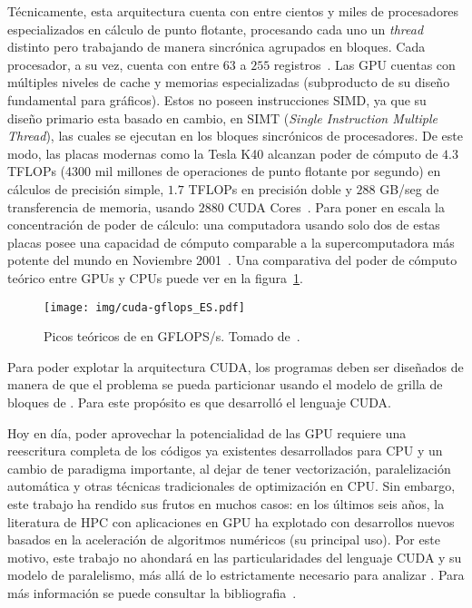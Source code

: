 T\'ecnicamente, esta arquitectura cuenta con entre cientos y miles de procesadores especializados en c\'alculo de punto flotante, procesando cada uno un \textit{thread} distinto pero
trabajando de manera sincr\'onica agrupados en bloques.
Cada procesador, a su vez, cuenta con entre $63$ a $255$ registros~\cite{NvidiaFermi,NvidiaKepler}.
Las GPU cuentas con m\'ultiples niveles de cache y memorias especializadas (subproducto de su dise\~no fundamental para gr\'aficos).
Estos no poseen instrucciones SIMD, ya que su dise\~no primario esta basado en cambio, en SIMT (\textit{Single Instruction Multiple Thread}), las cuales se ejecutan en los bloques sincr\'onicos de procesadores.
De este modo, las placas modernas como la \nvidia{} Tesla K40 alcanzan poder de c\'omputo de $4.3$ TFLOPs (4300 mil millones de operaciones de punto flotante por segundo) en c\'alculos de precisi\'on simple, $1.7$ TFLOPs en precisi\'on doble y $288$ GB/seg de transferencia de memoria, usando $2880$ CUDA Cores~\cite{NvidiaKeplerDatasheet}.
Para poner en escala la concentraci\'on de poder de c\'alculo: una computadora usando solo dos de estas placas posee una capacidad
de c\'omputo comparable a la supercomputadora m\'as potente del mundo en Noviembre 2001~\cite{Top500November2001}.
Una comparativa del poder de c\'omputo te\'orico entre GPUs y CPUs puede ver en la figura~\ref{fig:cuda-gflops}.

\begin{figure}[htbp]
    \centering
    \texttt{[image: img/cuda-gflops\_ES.pdf]}
    \caption{Picos te\'oricos de \performance{} en GFLOPS/s. Tomado de~\cite{cudaProgrammingGuide}.}
    \label{fig:cuda-gflops}
\end{figure}

Para poder explotar la arquitectura CUDA, los programas deben ser dise\~nados de manera de que el problema se pueda particionar usando el modelo de grilla de bloques de \threads{}.
Para este prop\'osito es que \nvidia{} desarroll\'o el lenguaje CUDA.

Hoy en d\'ia, poder aprovechar la potencialidad de las GPU requiere una reescritura completa de los c\'odigos ya existentes desarrollados para CPU y un cambio de paradigma importante, al dejar de tener vectorizaci\'on, paralelizaci\'on autom\'atica y otras t\'ecnicas tradicionales de optimizaci\'on en CPU.
Sin embargo, este trabajo ha rendido sus frutos en muchos casos: en los \'ultimos seis a\~nos, la literatura de HPC con aplicaciones en GPU ha explotado con desarrollos nuevos basados en la aceleraci\'on de algoritmos num\'ericos (su principal uso). Por este motivo, este trabajo no ahondar\'a
en las particularidades del lenguaje CUDA y su modelo de paralelismo, m\'as all\'a de lo estrictamente necesario para analizar \performance{}. Para m\'as informaci\'on se puede consultar la bibliografia~\cite{cudaHandbook,farberCuda,CudaOverview}.

